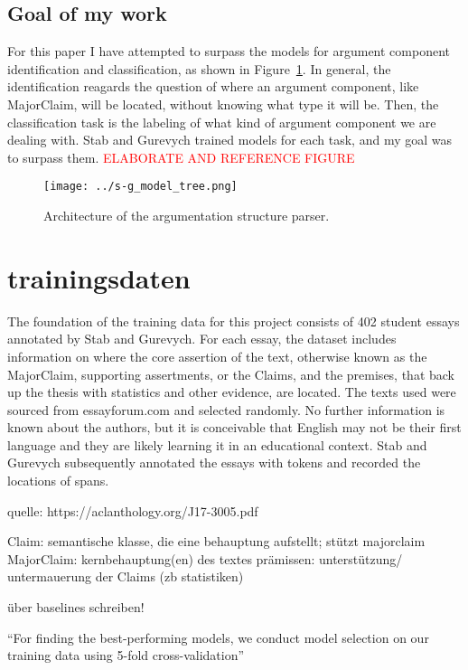 \documentclass[12]{article}
\theoremstyle{mytheoremstyle}
\theoremstyle{mytheoremstyle}
\theoremstyle{myproblemstyle}
\begin{document}
  \subsection{Goal of my work}
  For this paper I have attempted to surpass the models for argument component identification and classification, as shown in Figure~\ref{fig:model_tree}. In general, the identification reagards the question of where an argument component, like MajorClaim, will be located, without knowing what type it will be. Then, the classification task is the labeling of what kind of argument component we are dealing with. Stab and Gurevych trained models for each task, and my goal was to surpass them.  \textcolor{red}{ELABORATE AND REFERENCE FIGURE} 
  \begin{figure}[!h]
    \centering
    \texttt{[image: ../s-g\_model\_tree.png]}
    \caption{Architecture of the argumentation structure parser.}
    \label{fig:model_tree}
  \end{figure}
  \section{trainingsdaten\dotfill}
  The foundation of the training data for this project consists of 402 student essays annotated by Stab and Gurevych. For each essay, the dataset includes information on where the core assertion of the text, otherwise known as the MajorClaim, supporting assertments, or the Claims, and the premises, that back up the thesis with statistics and other evidence, are located. 
The texts used were sourced from essayforum.com and selected randomly. No further information is known about the authors, but it is conceivable that English may not be their first language and they are likely learning it in an educational context.
Stab and Gurevych subsequently annotated the essays with tokens and recorded the locations of spans.

  quelle: https://aclanthology.org/J17-3005.pdf

  Claim: semantische klasse, die eine behauptung aufstellt; stützt majorclaim 
  MajorClaim: kernbehauptung(en) des textes 
  prämissen: unterstützung/ untermauerung der Claims (zb statistiken) 

  über baselines schreiben!

  ``For finding the best-performing models, we conduct model selection on our training data using 5-fold cross-validation''
\end{document}
